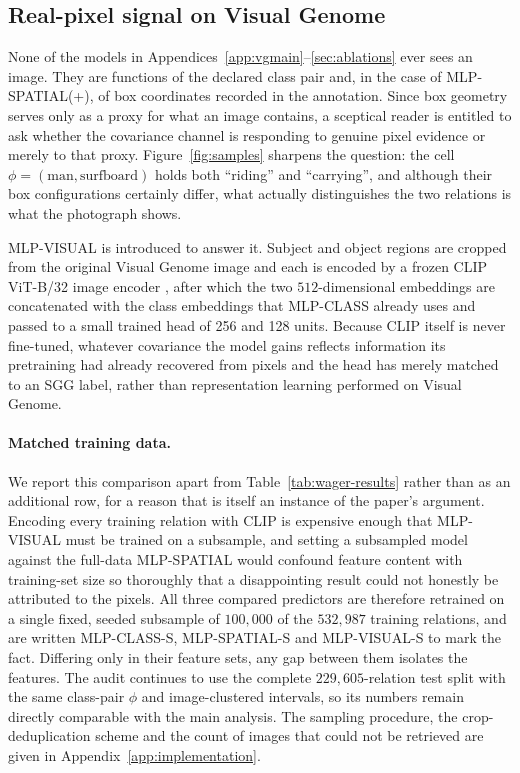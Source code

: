 \subsection{Real-pixel signal on Visual Genome}\label{app:vgvisual}\label{sec:vgvisual}

None of the models in Appendices~\ref{app:vgmain}--\ref{sec:ablations} ever sees an image.
They are functions of the declared class pair and, in the case of MLP-SPATIAL(+), of box
coordinates recorded in the annotation. Since box geometry serves only as a proxy for
what an image contains, a sceptical reader is entitled to ask whether the covariance
channel is responding to genuine pixel evidence or merely to that proxy.
Figure~\ref{fig:samples} sharpens the question: the cell
$\phi=(\text{man},\text{surfboard})$ holds both ``riding'' and ``carrying'', and although
their box configurations certainly differ, what actually distinguishes the two relations
is what the photograph shows.

MLP-VISUAL is introduced to answer it. Subject and object regions are cropped from the
original Visual Genome image and each is encoded by a frozen CLIP ViT-B/32 image encoder
\citep{radford2021learning}, after which the two $512$-dimensional embeddings are
concatenated with the class embeddings that MLP-CLASS already uses and passed to a small
trained head of 256 and 128 units. Because CLIP itself is never fine-tuned, whatever
covariance the model gains reflects information its pretraining had already recovered
from pixels and the head has merely matched to an SGG label, rather than representation
learning performed on Visual Genome.

\paragraph{Matched training data.} We report this comparison apart from
Table~\ref{tab:wager-results} rather than as an additional row, for a reason that is
itself an instance of the paper's argument. Encoding every training relation with CLIP is
expensive enough that MLP-VISUAL must be trained on a subsample, and setting a subsampled
model against the full-data MLP-SPATIAL would confound feature content with training-set
size so thoroughly that a disappointing result could not honestly be attributed to the
pixels. All three compared predictors are therefore retrained on a single fixed, seeded
subsample of $100{,}000$ of the $532{,}987$ training relations, and are written
MLP-CLASS-S, MLP-SPATIAL-S and MLP-VISUAL-S to mark the fact. Differing only in their
feature sets, any gap between them isolates the features. The audit continues to use the
complete $229{,}605$-relation test split with the same class-pair $\phi$ and
image-clustered intervals, so its numbers remain directly comparable with the main
analysis. The sampling procedure, the crop-deduplication scheme and the count of images
that could not be retrieved are given in Appendix~\ref{app:implementation}.

